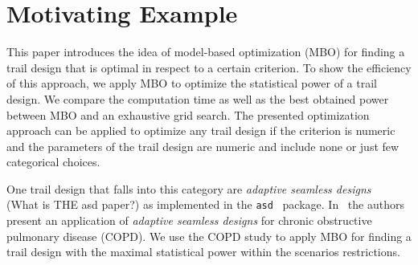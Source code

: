 \documentclass[bimj,fleqn]{w-art}
\theoremstyle{plain}
\theoremstyle{definition}
\begin{document}
\section{Motivating Example}

This paper introduces the idea of model-based optimization (MBO) for finding a trail design that is optimal in respect to a certain criterion.
To show the efficiency of this approach, we apply MBO to optimize the statistical power of a trail design.
We compare the computation time as well as the best obtained power between MBO and an exhaustive grid search.
The presented optimization approach can be applied to optimize any trail design if the criterion is numeric and the parameters of the trail design are numeric and include none or just few categorical choices.

One trail design that falls into this category are \emph{adaptive seamless designs}~\citep{barnes_integrating_2010} (What is THE asd paper?) as implemented in the \texttt{asd}~\cite{parsons_software_2011} package.
In~\citet{friede_adaptive_2020} the authors present an application of \emph{adaptive seamless designs} for chronic obstructive pulmonary disease (COPD).
We use the COPD study to apply MBO for finding a trail design with the maximal statistical power within the scenarios restrictions.
\end{document}
